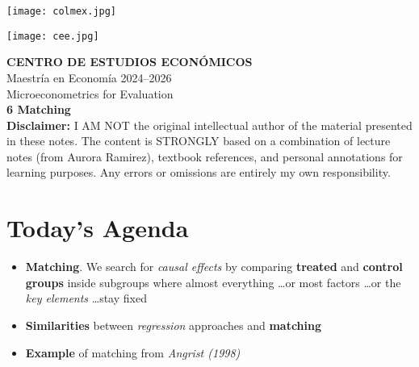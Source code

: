 \documentclass[12pt]{article}
\title{}
\author{}
\date{}
\begin{document}
\begin{titlepage}
    \vspace*{-1cm}
    \noindent
    \begin{minipage}[t]{0.49\textwidth}
        \texttt{[image: colmex.jpg]}
    \end{minipage}%
    \begin{minipage}[t]{0.49\textwidth}
        \raggedleft
        \texttt{[image: cee.jpg]}
    \end{minipage}

    \vspace*{2cm}

    \begin{center}
        \Huge \textbf{CENTRO DE ESTUDIOS ECONÓMICOS} \\[1.5em]
        \Large Maestría en Economía 2024--2026 \\[2em]
        \Large Microeconometrics for Evaluation \\[3em]
        \LARGE \textbf{6 Matching} \\[3em]
        \large \textbf{Disclaimer:} I AM NOT the original intellectual author of the material presented in these notes. The content is STRONGLY based on a combination of lecture notes (from Aurora Ramirez), textbook references, and personal annotations for learning purposes. Any errors or omissions are entirely my own responsibility.\\[0.9em]
        
    \end{center}

    \vfill
\end{titlepage}

\newpage

\setcounter{secnumdepth}{2}
\setcounter{tocdepth}{4}
\tableofcontents

\newpage

\section*{\noindent\textbf{Today’s Agenda}}

\begin{itemize}
    \item \textbf{Matching}. We search for \textit{causal effects} by comparing \textbf{treated} and \textbf{control groups} inside subgroups where almost everything \ldots or most factors \ldots or the \textit{key elements} \ldots stay fixed
    \item \textbf{Similarities} between \textit{regression} approaches and \textbf{matching}
    \item \textbf{Example} of matching from \textit{Angrist (1998)}
\end{itemize}
\end{document}
